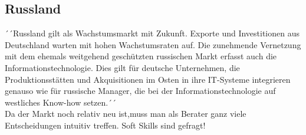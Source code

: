 	\subsection{Russland}
	´´Russland gilt als Wachstumsmarkt mit Zukunft. Exporte und Investitionen aus Deutschland warten mit hohen Wachstumsraten auf. Die zunehmende Vernetzung mit dem ehemals weitgehend geschützten russischen Markt erfasst auch die Informationstechnologie. Dies gilt für deutsche Unternehmen, die Produktionsstätten und Akquisitionen im Osten in ihre IT-Systeme integrieren genauso wie für russische Manager, die bei der Informationstechnologie auf westliches Know-how setzen.´´\\
	
	Da der Markt noch relativ neu ist,muss man als Berater ganz viele Entscheidungen intuitiv treffen.
	Soft Skills sind gefragt!\\
	
